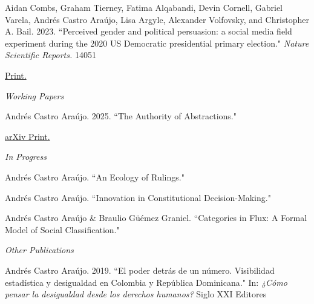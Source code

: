 \documentclass[11pt,article,oneside]{memoir}
\begin{document}

\ind \normalsize Aidan Combs, Graham Tierney, Fatima Alqabandi, Devin Cornell, Gabriel Varela, \colorbox{Gray!15}{Andrés Castro Araújo}, Lisa Argyle, Alexander Volfovsky, and Christopher A. Bail. 2023. ``Perceived gender and political persuasion: a social media field experiment during the 2020 US Democratic presidential primary election." 
\emph{Nature Scientific Reports.} 14051 \par
\ind \hspace{0.35in} \footnotesize \href{https://doi.org/10.1038/s41598-023-39359-0}{Print.} \vspace{0.05in}

\bigskip

\ind \normalsize \emph{Working Papers}\par \vspace{0.075in}


\ind \normalsize \colorbox{Gray!15}{Andrés Castro Araújo}. 2025. ``The Authority of Abstractions." \par
\ind \hspace{0.35in} \footnotesize \href{https://osf.io/preprints/osf/ysa7g_v1}{arXiv Print.} \vspace{0.05in}

\bigskip

\ind \normalsize \emph{In Progress}\par \vspace{0.075in}


\ind \normalsize \colorbox{Gray!15}{Andrés Castro Araújo}. ``An Ecology of Rulings." \medskip


\ind \normalsize \colorbox{Gray!15}{Andrés Castro Araújo}. ``Innovation in Constitutional Decision-Making." \medskip


\ind \normalsize \colorbox{Gray!15}{Andrés Castro Araújo} \& Braulio Güémez Graniel. ``Categories in Flux: A Formal Model of Social Classification." \medskip

\bigskip

\ind \normalsize \emph{Other Publications}\par \vspace{0.075in}


\ind \normalsize \colorbox{Gray!15}{Andrés Castro Araújo}. 2019. ``El poder detrás de un número. Visibilidad estadística y desigualdad en Colombia y República Dominicana." In: \emph{¿Cómo pensar la desigualdad desde los derechos humanos?} Siglo XXI Editores \par
\end{document}
